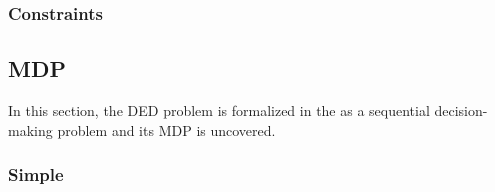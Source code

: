 \subsubsection{Constraints}


\subsection{\acf{MDP}}

In this section, the \ac{DED} problem is formalized in the as a sequential decision-making problem and its \ac{MDP} is uncovered. 

\subsubsection{Simple}

